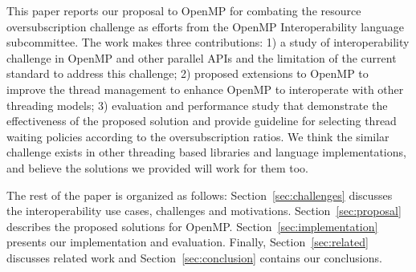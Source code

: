 
This paper reports our proposal to OpenMP for combating the resource oversubscription challenge as efforts from
the OpenMP Interoperability language subcommittee. The work makes three contributions: 1) a study 
of interoperability challenge in OpenMP and other parallel APIs and the limitation 
of the current standard to address this challenge; 2) proposed extensions to OpenMP to improve the thread
management to enhance OpenMP to interoperate with other threading models; 3) evaluation and performance
study that demonstrate the effectiveness of the proposed solution and provide guideline for selecting thread
waiting policies according to the oversubscription ratios. 
We think the similar challenge exists in other threading based libraries and language implementations, and believe
the solutions we provided  will work for them too.  

The rest of the paper is organized as follows: Section~\ref{sec:challenges} discusses the interoperability 
use cases, challenges and motivations. 
 Section~\ref{sec:proposal} describes the proposed solutions for OpenMP. %
 Section~\ref{sec:implementation} presents our implementation and evaluation. 
 Finally, Section~\ref{sec:related} discusses related
work and Section~\ref{sec:conclusion} contains our conclusions.






